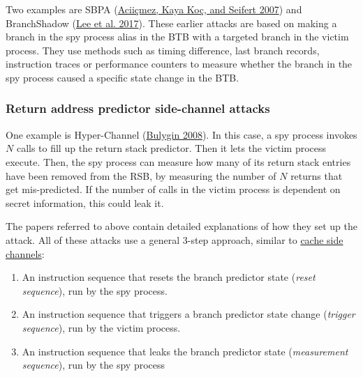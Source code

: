 \documentclass[
  a4paper,
]{report}
\providecommand{\tightlist}{%
  \setlength{\itemsep}{0pt}\setlength{\parskip}{0pt}}
\begin{document}
Two examples are SBPA (\protect\hyperlink{ref-Aciicmez2007}{Aciiçmez,
Kaya Koç, and Seifert 2007}) and BranchShadow
(\protect\hyperlink{ref-Lee2017}{Lee et al. 2017}).
These earlier attacks are based on making a branch in the spy process
alias in the BTB with a targeted branch in the victim
process. They use methods such as timing difference, last branch
records, instruction
traces or performance
counters to measure whether the branch in the
spy process caused a specific state change in the BTB.

\hypertarget{return-address-predictor-side-channel-attacks}{%
\subsubsection{Return address predictor side-channel
attacks}\label{return-address-predictor-side-channel-attacks}}


One example is Hyper-Channel
(\protect\hyperlink{ref-Bulygin2008}{Bulygin
2008}). In this case, a spy process invokes \(N\)
calls to fill up the return stack predictor. Then it lets the victim
process execute. Then, the spy process can measure how many of its
return stack entries have been removed from the RSB, by measuring the
number of \(N\) returns that get mis-predicted. If the number of calls
in the victim process is dependent on secret information, this could
leak it.

The papers referred to above contain detailed explanations of how they
set up the attack. All of these attacks use a general 3-step approach,
similar to
\protect\hyperlink{general-schema-for-cache-covert-channels}{cache side
channels}:

\begin{enumerate}
\def\labelenumi{\arabic{enumi}.}
\tightlist
\item
  An instruction sequence that resets the branch predictor state
  (\emph{reset sequence}), run by the spy process.
\item
  An instruction sequence that triggers a branch predictor state change
  (\emph{trigger sequence}), run by the victim
  process.
\item
  An instruction sequence that leaks the branch predictor state
  (\emph{measurement sequence}), run by the spy
  process
\end{enumerate}
\end{document}
